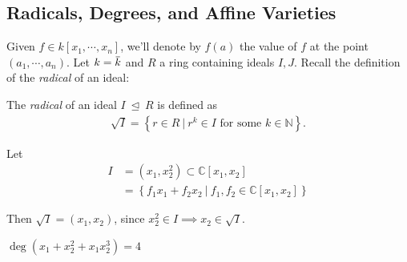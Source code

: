 \hypertarget{radicals-degrees-and-affine-varieties}{%
\subsection{Radicals, Degrees, and Affine
Varieties}\label{radicals-degrees-and-affine-varieties}}

Given \(f\in k[x_1, \cdots, x_n]\), we'll denote by \(f(a)\) the value
of \(f\) at the point \((a_1, \cdots, a_n)\). Let
\(k = \mkern 1.5mu\overline{\mkern-1.5muk\mkern-1.5mu}\mkern 1.5mu\) and
\(R\) a ring containing ideals \(I, J\). Recall the definition of the
\emph{radical} of an ideal:

\begin{definition}[Radical]

The \emph{radical} of an ideal \(I {~\trianglelefteq~}R\) is defined as
\begin{align*}  
\sqrt{I} = \left\{{r\in R {~\mathrel{\Big|}~}r^k\in I \text{ for some } k\in {\mathbb{N}}}\right\}
.\end{align*}

\end{definition}

\begin{example}

Let
\begin{align*}
I &= (x_1, x_2^2) \subset {\mathbb{C}}[x_1, x_2] \\
  &= \left\{{ f_1 x_1 + f_2 x_2 {~\mathrel{\Big|}~}f_1, f_2 \in {\mathbb{C}}[x_1, x_2]}\right\}
\end{align*}

Then \(\sqrt{I} = (x_1, x_2)\), since
\(x_2^2 \in I \implies x_2 \in \sqrt{I}\).

\end{example}


\begin{example}

\(\deg(x_1 + x_2^2 + x_1 x_2^3) = 4\)

\end{example}

